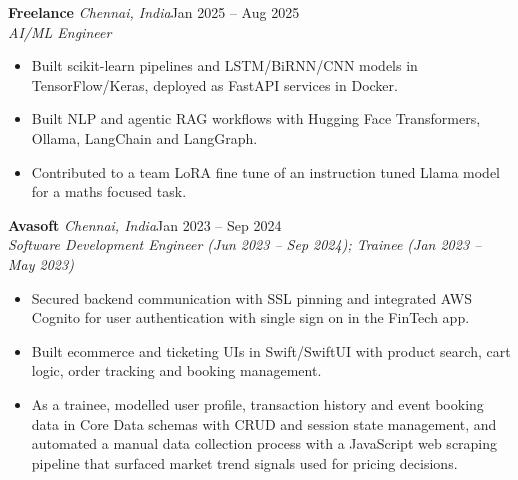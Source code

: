 \documentclass[a4paper,11pt]{article}
\newcommand{\role}[4]{%
  \textbf{#1}{\color{muted}\,\textperiodcentered\,\textit{#2}}\hfill{\color{muted}#3}\\
  \textit{#4}\par}
\newcommand{\gap}{\vspace{5pt}}
\begin{document}
\gap
{}
\role{Freelance}{Chennai, India}{Jan 2025 – Aug 2025}{AI/ML Engineer}
\begin{itemize}
  \item Built scikit-learn pipelines and LSTM/BiRNN/CNN models in TensorFlow/Keras, deployed as FastAPI services in Docker.
  \item Built NLP and agentic RAG workflows with Hugging Face Transformers, Ollama, LangChain and LangGraph.
  \item Contributed to a team LoRA fine tune of an instruction tuned Llama model for a maths focused task.
\end{itemize}
\gap
{}
\role{Avasoft}{Chennai, India}{Jan 2023 – Sep 2024}{Software Development Engineer (Jun 2023 – Sep 2024); Trainee (Jan 2023 – May 2023)}
\begin{itemize}
  \item Secured backend communication with SSL pinning and integrated AWS Cognito for user authentication with single sign on in the FinTech app.
  \item Built ecommerce and ticketing UIs in Swift/SwiftUI with product search, cart logic, order tracking and booking management.
  \item As a trainee, modelled user profile, transaction history and event booking data in Core Data schemas with CRUD and session state management, and automated a manual data collection process with a JavaScript web scraping pipeline that surfaced market trend signals used for pricing decisions.
\end{itemize}
\end{document}
